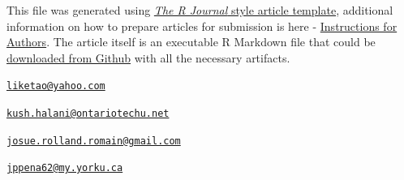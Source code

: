 This file was generated using
\href{https://github.com/rstudio/rticles}{\emph{The R Journal} style
article template}, additional information on how to prepare articles for
submission is here -
\href{https://journal.r-project.org/share/author-guide.pdf}{Instructions
for Authors}. The article itself is an executable R Markdown file that
could be
\href{https://github.com/ivbsoftware/big-data-final-2/blob/master/docs/R_Journal/big-data-final-2/}{downloaded
from Github} with all the necessary artifacts.


\address{%
Ketao Li\\
York University\\
\\
}
\href{mailto:liketao@yahoo.com}{\nolinkurl{liketao@yahoo.com}}

\address{%
Kush Halani\\
York University\\
\\
}
\href{mailto:kush.halani@ontariotechu.net}{\nolinkurl{kush.halani@ontariotechu.net}}

\address{%
Josue Romain\\
York University\\
\\
}
\href{mailto:josue.rolland.romain@gmail.com}{\nolinkurl{josue.rolland.romain@gmail.com}}

\address{%
Juan Peña\\
York University\\
\\
}
\href{mailto:jppena62@my.yorku.ca}{\nolinkurl{jppena62@my.yorku.ca}}


